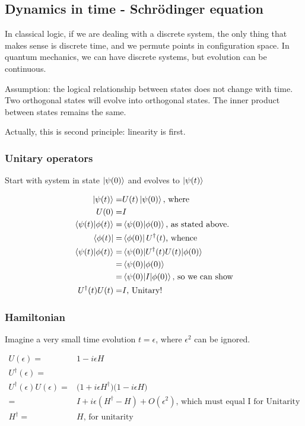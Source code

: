 \documentclass[]{article}
\begin{document}
\subsection{Dynamics in time - Schr\"odinger equation}

In classical logic, if we are dealing with a discrete system, the only thing that makes sense is discrete time, and we permute points in configuration space. In quantum mechanics, we can have discrete systems, but evolution can be continuous.

Assumption: the logical relationship between states does not change with time. Two orthogonal states will evolve into orthogonal states. The inner product between states remains the same.

Actually, this is second principle: linearity is first.


\subsubsection{Unitary operators}

Start with system in state $\ket{\psi(0)}$ and evolves to $\ket{\psi(t)}$

\begin{align*}
	\ket{\psi(t)} =& U(t) \ket{\psi(0)} \text{, where}\\
	U(0) =& I\\
	\braket{\psi(t)\vert\phi(t)} =& \braket{\psi(0)\vert\phi(0)} \text{, as stated above.}\\
	\bra{\phi(t)} =& \bra{\phi(0)} U^\dagger(t) \text{, whence}\\
	\braket{\psi(t)\vert\phi(t)} =& \braket{\psi(0)\vert U^\dagger(t) U(t)\vert\phi(0)}\\
	=& \braket{\psi(0)\vert\phi(0)} \\
	=& \braket{\psi(0)\vert I \vert \phi(0)} \text{, so we can show}\\
	 U^\dagger(t) U(t)=& I \text {, Unitary!}
\end{align*}

\subsubsection{Hamiltonian}

Imagine a very small time evolution $t=\epsilon$, where $\epsilon^2$ can be ignored.

\begin{align*}
	U(\epsilon) =& 1 - i \epsilon H\\
	U^\dagger (\epsilon) =& \\
	U^\dagger (\epsilon)U(\epsilon) =& \big(1 + i \epsilon H^\dagger\big)\big(1 - i \epsilon H\big)\\
	=& I + i\epsilon (H^\dagger-H) + O(\epsilon^2) \text{, which must equal I for Unitarity}\\
	H^\dagger=& H \text{, for unitarity}
\end{align*}
\end{document}
